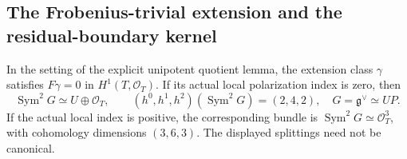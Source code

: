 \subsection{The Frobenius-trivial extension and the residual-boundary kernel}

\begin{lemma}
\label{lem:DE-A3-unipotent-Frobenius-candidate}
In the setting of the explicit unipotent quotient lemma, the extension
class $\gamma$ satisfies $F\gamma=0$ in $H^1(T,\mathcal O_T)$.
If its actual local polarization index is zero, then
\[
 \operatorname{Sym}^2G\simeq U\oplus\mathcal O_T,
 \qquad(h^0,h^1,h^2)(\operatorname{Sym}^2G)=(2,4,2),
 \quad G=\mathfrak g^\vee\simeq UP.
 \tag{DE-SK1}
\]
If the actual local index is positive, the corresponding bundle is
$\operatorname{Sym}^2G\simeq\mathcal O_T^3$, with cohomology dimensions
$(3,6,3)$. The displayed splittings need not be canonical.
\end{lemma}
